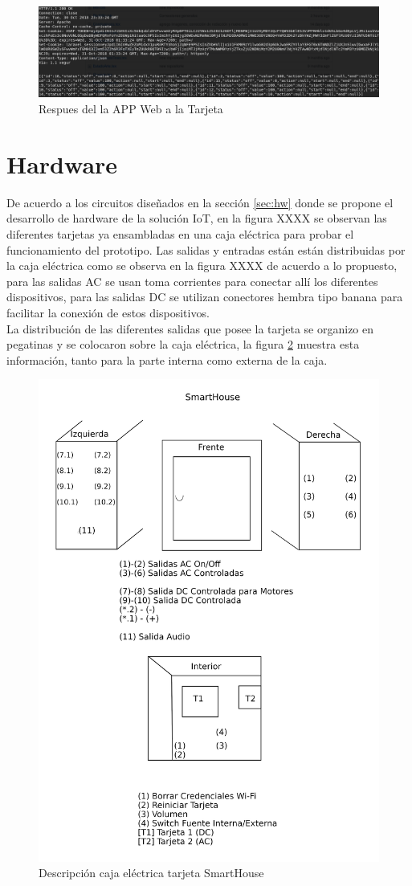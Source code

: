 \begin{figure}[H]
	\centering
	\caption{Respues del la APP Web a la Tarjeta}
	\label{fig:httprqstesp}
	\includegraphics[width=0.8\linewidth]{Imagenes/HTTPRqstesp}
\end{figure}


\section{Hardware}

De acuerdo a los circuitos diseñados en la sección \ref{sec:hw} donde se propone el desarrollo de hardware de la solución IoT, en la figura XXXX se observan las diferentes tarjetas ya ensambladas en una caja eléctrica para probar el funcionamiento del prototipo. Las salidas y entradas están están distribuidas por la caja eléctrica como se observa en la figura XXXX de acuerdo a lo propuesto, para las salidas AC se usan toma corrientes para conectar allí los diferentes dispositivos, para las salidas DC se utilizan conectores hembra tipo banana para facilitar la conexión de estos dispositivos.\\

La distribución de las diferentes salidas que posee la tarjeta se organizo en pegatinas y se colocaron sobre la caja eléctrica, la figura \ref{fig:labels} muestra esta información, tanto para la parte interna como externa de la caja.

\begin{figure}
	\centering
	\caption{Descripción caja eléctrica tarjeta SmartHouse}
	\label{fig:labels}
	\includegraphics[width=0.7\linewidth]{Imagenes/labels}
\end{figure}


